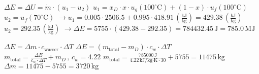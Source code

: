 \( \Delta E = \Delta U = \dot{m} \cdot (u_1 - u_2) \)  
\( u_1 = x_D \cdot x \cdot u_g(100^\circ \text{C}) + (1 - x) \cdot u_f(100^\circ \text{C}) \)  
\( u_2 = u_f(70^\circ \text{C}) \)  
\( \rightarrow u_1 = 0.005 \cdot 2506.5 + 0.995 \cdot 418.91 \, \left( \frac{\text{kJ}}{\text{kg}} \right) = 429.38 \, \left( \frac{\text{kJ}}{\text{kg}} \right) \)  
\( u_2 = 292.35 \, \left( \frac{\text{kJ}}{\text{kg}} \right) \)  
\( \rightarrow \Delta E = 5755 \cdot (429.38 - 292.35) = 784432.45 \, \text{J} = 785.0 \, \text{MJ} \)  

\( \Delta E = \Delta m \cdot c_{\text{wasser}} \cdot \Delta T \)  
\( \Delta E = (m_{\text{total}} - m_D) \cdot c_w \cdot \Delta T \)  
\( m_{\text{total}} = \frac{\Delta E}{c_w \cdot \Delta T} + m_D \, , \, c_w = 4.22 \)  
\( m_{\text{total}} = \frac{785000 \, \text{J}}{4.22 \, \text{kJ/kg·K} \cdot 30} + 5755 = 11475 \, \text{kg} \)  
\( \Delta m = 11475 - 5755 = 3720 \, \text{kg} \)